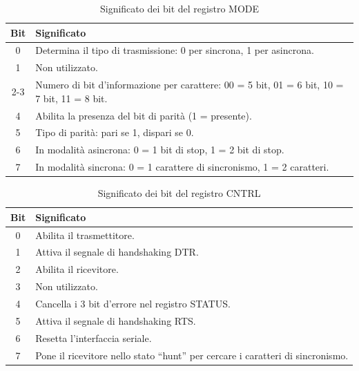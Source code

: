 \begin{table}[ht]
    \centering
    \begin{tabular}{|c|p{11cm}|}
    \hline
    \textbf{Bit} & \textbf{Significato} \\
    \hline
    0 & Determina il tipo di trasmissione: 0 per sincrona, 1 per asincrona. \\
    1 & Non utilizzato. \\
    2-3 & Numero di bit d'informazione per carattere: 00 = 5 bit, 01 = 6 bit, 10 = 7 bit, 11 = 8 bit. \\
    4 & Abilita la presenza del bit di parità (1 = presente). \\
    5 & Tipo di parità: pari se 1, dispari se 0. \\
    6 & In modalità asincrona: 0 = 1 bit di stop, 1 = 2 bit di stop. \\
    7 & In modalità sincrona: 0 = 1 carattere di sincronismo, 1 = 2 caratteri. \\
    \hline
    \end{tabular}
    \caption{Significato dei bit del registro MODE}\label{tab:MODE-8251}
\end{table}
    
\begin{table}[ht]
    \centering
    \begin{tabular}{|c|p{11cm}|}
    \hline
    \textbf{Bit} & \textbf{Significato} \\
    \hline
    0 & Abilita il trasmettitore. \\
    1 & Attiva il segnale di handshaking DTR. \\
    2 & Abilita il ricevitore. \\
    3 & Non utilizzato. \\
    4 & Cancella i 3 bit d'errore nel registro STATUS. \\
    5 & Attiva il segnale di handshaking RTS. \\
    6 & Resetta l'interfaccia seriale. \\
    7 & Pone il ricevitore nello stato ``hunt'' per cercare i caratteri di sincronismo. \\
    \hline
    \end{tabular}
    \caption{Significato dei bit del registro CNTRL}\label{tab:CNTRL-8251}
\end{table}

